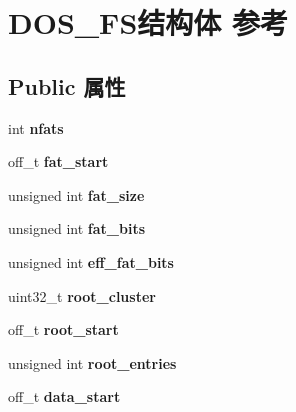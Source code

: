 \hypertarget{struct_d_o_s___f_s}{}\section{D\+O\+S\+\_\+\+F\+S结构体 参考}
\label{struct_d_o_s___f_s}
\subsection*{Public 属性}
\begin{DoxyCompactItemize}
\item 
\mbox{\label{struct_d_o_s___f_s_a5184a2103283e7a103242f58cdf0c302}} 
int {\bfseries nfats}
\item 
\mbox{\label{struct_d_o_s___f_s_a957b6c5b845616874e952d2d379f33a9}} 
off\+\_\+t {\bfseries fat\+\_\+start}
\item 
\mbox{\label{struct_d_o_s___f_s_a140ad17e43073ad12874d3ed46152ebf}} 
unsigned int {\bfseries fat\+\_\+size}
\item 
\mbox{\label{struct_d_o_s___f_s_a021e8d27602fa7c529bb0416739131c3}} 
unsigned int {\bfseries fat\+\_\+bits}
\item 
\mbox{\label{struct_d_o_s___f_s_a6bef9916d6471325a4150432aa097ba7}} 
unsigned int {\bfseries eff\+\_\+fat\+\_\+bits}
\item 
\mbox{\label{struct_d_o_s___f_s_aa64e98b2a7fbcfcaf43f99beb7d7edbf}} 
uint32\+\_\+t {\bfseries root\+\_\+cluster}
\item 
\mbox{\label{struct_d_o_s___f_s_ab1e4bf982e6402022597b30cab95cf3d}} 
off\+\_\+t {\bfseries root\+\_\+start}
\item 
\mbox{\label{struct_d_o_s___f_s_aa316bb24766cd704b16a55da30abc308}} 
unsigned int {\bfseries root\+\_\+entries}
\item 
\mbox{\label{struct_d_o_s___f_s_ac28c339dacc803cacb9f87c03955855b}} 
off\+\_\+t {\bfseries data\+\_\+start}
\item 
\mbox{\label{struct_d_o_s___f_s_a0e7e7525c9bbaa87d4111a3285fef4f6}} 

\end{DoxyCompactItemize}
